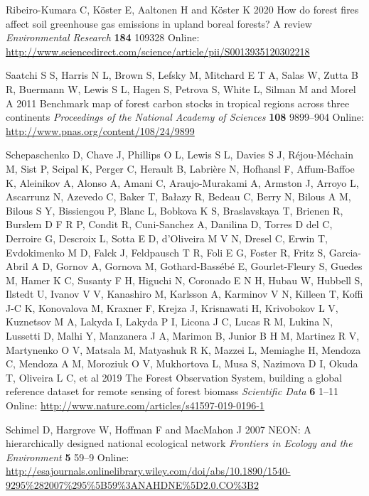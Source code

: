 \documentclass[
]{article}
\newlength{\cslhangindent}
\newenvironment{cslreferences}%
  {\setlength{\parindent}{0pt}%
  \everypar{\setlength{\hangindent}{\cslhangindent}}\ignorespaces}%
  {\par}
\begin{document}
\begin{cslreferences}
\leavevmode\hypertarget{ref-ribeiro-kumara_how_2020}{}%
Ribeiro-Kumara C, Köster E, Aaltonen H and Köster K 2020 How do forest
fires affect soil greenhouse gas emissions in upland boreal forests? A
review \emph{Environmental Research} \textbf{184} 109328 Online:
\url{http://www.sciencedirect.com/science/article/pii/S0013935120302218}

\leavevmode\hypertarget{ref-saatchi_benchmark_2011}{}%
Saatchi S S, Harris N L, Brown S, Lefsky M, Mitchard E T A, Salas W,
Zutta B R, Buermann W, Lewis S L, Hagen S, Petrova S, White L, Silman M
and Morel A 2011 Benchmark map of forest carbon stocks in tropical
regions across three continents \emph{Proceedings of the National
Academy of Sciences} \textbf{108} 9899--904 Online:
\url{http://www.pnas.org/content/108/24/9899}

\leavevmode\hypertarget{ref-schepaschenko_forest_2019}{}%
Schepaschenko D, Chave J, Phillips O L, Lewis S L, Davies S J,
Réjou-Méchain M, Sist P, Scipal K, Perger C, Herault B, Labrière N,
Hofhansl F, Affum-Baffoe K, Aleinikov A, Alonso A, Amani C,
Araujo-Murakami A, Armston J, Arroyo L, Ascarrunz N, Azevedo C, Baker T,
Bałazy R, Bedeau C, Berry N, Bilous A M, Bilous S Y, Bissiengou P, Blanc
L, Bobkova K S, Braslavskaya T, Brienen R, Burslem D F R P, Condit R,
Cuni-Sanchez A, Danilina D, Torres D del C, Derroire G, Descroix L,
Sotta E D, d'Oliveira M V N, Dresel C, Erwin T, Evdokimenko M D, Falck
J, Feldpausch T R, Foli E G, Foster R, Fritz S, Garcia-Abril A D, Gornov
A, Gornova M, Gothard-Bassébé E, Gourlet-Fleury S, Guedes M, Hamer K C,
Susanty F H, Higuchi N, Coronado E N H, Hubau W, Hubbell S, Ilstedt U,
Ivanov V V, Kanashiro M, Karlsson A, Karminov V N, Killeen T, Koffi J-C
K, Konovalova M, Kraxner F, Krejza J, Krisnawati H, Krivobokov L V,
Kuznetsov M A, Lakyda I, Lakyda P I, Licona J C, Lucas R M, Lukina N,
Lussetti D, Malhi Y, Manzanera J A, Marimon B, Junior B H M, Martinez R
V, Martynenko O V, Matsala M, Matyashuk R K, Mazzei L, Memiaghe H,
Mendoza C, Mendoza A M, Moroziuk O V, Mukhortova L, Musa S, Nazimova D
I, Okuda T, Oliveira L C, et al 2019 The Forest Observation System,
building a global reference dataset for remote sensing of forest biomass
\emph{Scientific Data} \textbf{6} 1--11 Online:
\url{http://www.nature.com/articles/s41597-019-0196-1}

\leavevmode\hypertarget{ref-schimel_neon_2007}{}%
Schimel D, Hargrove W, Hoffman F and MacMahon J 2007 NEON: A
hierarchically designed national ecological network \emph{Frontiers in
Ecology and the Environment} \textbf{5} 59--9 Online:
\url{http://esajournals.onlinelibrary.wiley.com/doi/abs/10.1890/1540-9295\%282007\%295\%5B59\%3ANAHDNE\%5D2.0.CO\%3B2}


\end{cslreferences}
\end{document}
